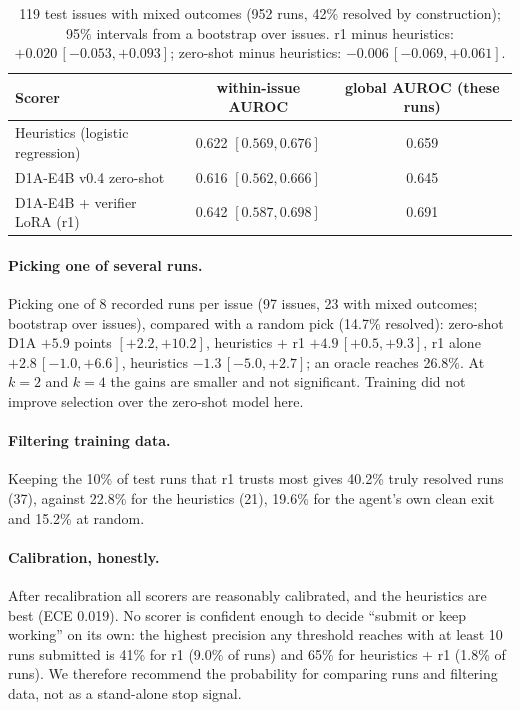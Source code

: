 \documentclass[11pt]{article}
\begin{document}
\begin{table}[h]\centering\small
\begin{tabular}{lcc}\toprule
Scorer & within-issue AUROC & global AUROC (these runs) \\\midrule
Heuristics (logistic regression) & 0.622 $[0.569, 0.676]$ & 0.659 \\
D1A-E4B v0.4 zero-shot & 0.616 $[0.562, 0.666]$ & 0.645 \\
D1A-E4B + verifier LoRA (r1) & 0.642 $[0.587, 0.698]$ & 0.691 \\\bottomrule
\end{tabular}
\caption{119 test issues with mixed outcomes (952 runs, 42\% resolved by construction); 95\% intervals from a bootstrap over issues.
r1 minus heuristics: $+0.020\,[-0.053, +0.093]$; zero-shot minus heuristics: $-0.006\,[-0.069, +0.061]$.}\label{tab:within}
\end{table}

\paragraph{Picking one of several runs.} Picking one of 8 recorded runs per issue (97 issues, 23 with mixed outcomes; bootstrap over issues), compared with a random pick
(14.7\% resolved): zero-shot D1A $+5.9$ points $[+2.2, +10.2]$, heuristics + r1 $+4.9\,[+0.5, +9.3]$, r1 alone $+2.8\,[-1.0, +6.6]$, heuristics
$-1.3\,[-5.0, +2.7]$; an oracle reaches 26.8\%. At $k=2$ and $k=4$ the gains are smaller and not significant. Training did not improve selection over the
zero-shot model here.

\paragraph{Filtering training data.} Keeping the 10\% of test runs that r1 trusts most gives 40.2\% truly resolved runs (37), against 22.8\% for the
heuristics (21), 19.6\% for the agent's own clean exit and 15.2\% at random.

\paragraph{Calibration, honestly.} After recalibration all scorers are reasonably calibrated, and the heuristics are best (ECE 0.019). No scorer is
confident enough to decide ``submit or keep working'' on its own: the highest precision any threshold reaches with at least 10 runs submitted is 41\% for r1
(9.0\% of runs) and 65\% for heuristics + r1 (1.8\% of runs). We therefore recommend the probability for comparing runs and filtering data, not as a
stand-alone stop signal.
\end{document}
